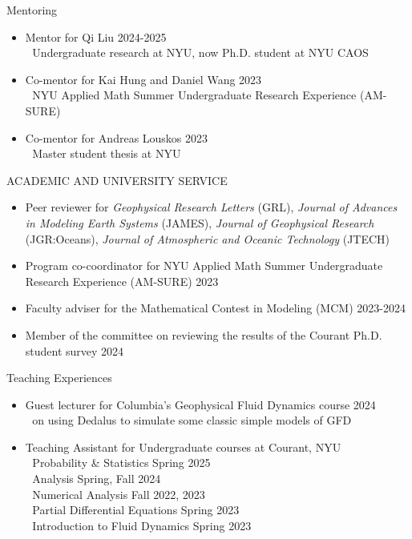 \documentclass{resume} %
\begin{document}
\begin{rSection}{Mentoring}
\begin{itemize}
    \itemsep -0.3em
    \item Mentor for Qi Liu \hfill 2024-2025\\
    $\left.\;\right.$ Undergraduate research at NYU, now Ph.D. student at NYU CAOS
    \item Co-mentor for Kai Hung and Daniel Wang \hfill 2023 \\
    $\left.\;\right.$ NYU Applied Math Summer Undergraduate Research Experience (AM-SURE)
    \item Co-mentor for Andreas Louskos  \hfill 2023\\
    $\left.\;\right.$ Master student thesis at NYU
\end{itemize}
\end{rSection}


\begin{rSection}{ACADEMIC AND UNIVERSITY SERVICE}
\begin{itemize}
    \itemsep -0.3em
    \item Peer reviewer for \textit{Geophysical Research Letters} (GRL), \textit{Journal of Advances in Modeling Earth Systems} (JAMES), \textit{Journal of Geophysical Research} (JGR:Oceans), 
    \textit{Journal of Atmospheric and Oceanic Technology} (JTECH)
    \item Program co-coordinator for NYU Applied Math Summer Undergraduate Research Experience (AM-SURE) \hfill 2023
    \item Faculty adviser for the Mathematical Contest in Modeling (MCM) \hfill 2023-2024
    \item Member of the committee on reviewing the results of the Courant Ph.D. student survey \hfill 2024
\end{itemize}
\end{rSection}

\begin{rSection}{Teaching Experiences}
\begin{itemize}
    \item Guest lecturer for Columbia's Geophysical Fluid Dynamics course \hfill 2024\\
    $\left.\;\right.$ on using Dedalus to simulate some classic simple models of GFD
    \item Teaching Assistant for Undergraduate courses at Courant, NYU\\
    $\left.\;\right.$ Probability \& Statistics \hfill Spring 2025\\
    $\left.\;\right.$ Analysis \hfill Spring, Fall 2024\\
    $\left.\;\right.$ Numerical Analysis \hfill Fall 2022, 2023\\
    $\left.\;\right.$ Partial Differential Equations \hfill Spring 2023\\
    $\left.\;\right.$ Introduction to Fluid Dynamics \hfill Spring 2023
\end{itemize}
\end{rSection}
\end{document}
